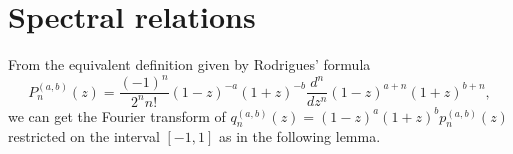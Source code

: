 \section{Spectral relations}

From the equivalent definition given by Rodrigues' formula
\[
  P_{n}^{(a,b)}(z) = \frac{(-1)^n}{2^nn!} (1-z)^{-a}(1+z)^{-b}
  \frac{d^n}{dz^n} (1-z)^{a+n}(1+z)^{b+n},
\]
we can get the Fourier transform of $q_n^{(a,b)}(z) = (1-z)^a(1+z)^bp_n^{(a,b)}(z)$
restricted on the interval $[-1,1]$ as in the following lemma.
\begin{lem}
\end{lem}
